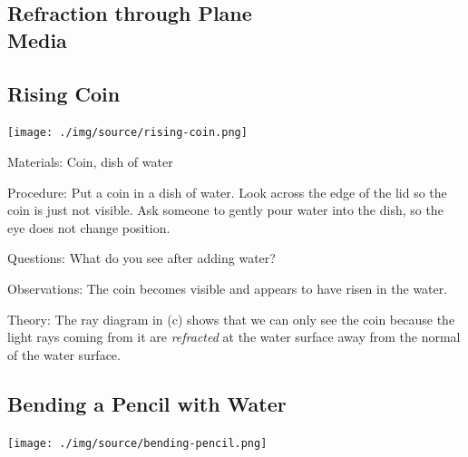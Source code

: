\begin{multicols}{2}

\section*{Refraction through Plane \hfill \\ Media}


\subsection{Rising Coin}

\begin{center}
\texttt{[image: ./img/source/rising-coin.png]}
\end{center}

\begin{description*}
\item[Materials:]{Coin, dish of water}
\item[Procedure:]{Put a coin in a dish of water. Look across the edge of the lid so the coin is just not visible. Ask someone to gently pour water into the dish, so the eye does not change position.}
\item[Questions:]{What do you see after adding water?}
\item[Observations:]{The coin becomes visible and appears to have risen in the water.}
\item[Theory:]{The ray diagram in (c) shows that we can only see the coin because the light rays coming from it are \emph{refracted} at the water surface away from the normal of the water surface.}
\end{description*}

\subsection{Bending a Pencil with Water}

\begin{center}
\texttt{[image: ./img/source/bending-pencil.png]}
\end{center}


\end{multicols}
